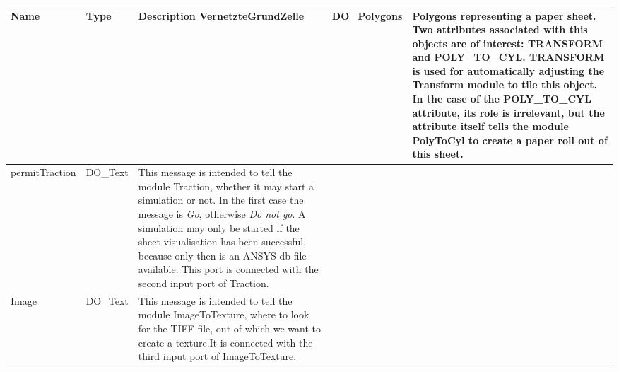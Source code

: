 \begin{htmlonly}
 
\begin{longtable}{|p{3.5cm}|p{4cm}|p{7cm}|}
\hline
   \bf{Name} & \bf{Type} & \bf{Description} \endhead
\hline\hline
	\textcolor{required}{VernetzteGrundZelle} & DO\_Polygons& 
                          Polygons representing a paper sheet.
                    Two attributes associated with this objects
                    are of interest: TRANSFORM and POLY\_TO\_CYL.
                    TRANSFORM is used for automatically adjusting
                    the Transform module to tile this object.
                    In the case of the POLY\_TO\_CYL attribute,
                    its role is irrelevant, but the attribute
                    itself tells the module PolyToCyl to create
                    a paper roll out of this sheet.\\
\hline
	\textcolor{required}{permitTraction} & DO\_Text& 
                    This message is intended to tell
                    the module Traction, whether it may start
                    a simulation or not. In the first case
                    the message is {\sl Go}, otherwise
                    {\sl Do not go}. A simulation may only be started
                    if the sheet visualisation has been successful,
                    because only then is an ANSYS db file available.
                    This port is connected with the second input port
                    of Traction.\\
\hline
	\textcolor{required}{Image} & DO\_Text& 
                    This message is intended to tell
                    the module ImageToTexture, where to
                    look for the TIFF file, out of which we want to
                    create a texture.It is connected with the
                    third input port of ImageToTexture.\\ 

\hline
\end{longtable}



\end{htmlonly}
